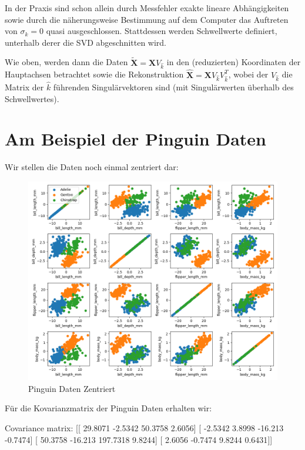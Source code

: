 \documentclass[]{book}
\newenvironment{Shaded}{\begin{snugshade}}{\end{snugshade}}
\newcommand{\FloatTok}[1]{\textcolor[rgb]{0.00,0.00,0.81}{#1}}
\newcommand{\NormalTok}[1]{#1}
\theoremstyle{definition}
\theoremstyle{definition}
\theoremstyle{definition}
\theoremstyle{definition}
\theoremstyle{remark}
\begin{document}
In der Praxis sind schon allein durch Messfehler exakte lineare Abhängigkeiten sowie durch die näherungsweise Bestimmung auf dem Computer das Auftreten von \(\sigma_k =0\) quasi ausgeschlossen. Stattdessen werden Schwellwerte definiert, unterhalb derer die SVD abgeschnitten wird.

Wie oben, werden dann die Daten \(\tilde {\mathbf{X}}={\mathbf{X}}V_{\hat k}\) in den (reduzierten) Koordinaten der Hauptachsen betrachtet sowie die Rekonstruktion \(\hat {\mathbf{X}}= {\mathbf{X}}V_{\hat k}V_{\hat k}^T\), wobei der \(V_{\hat k}\) die Matrix der \(\hat k\) führenden Singulärvektoren sind (mit Singulärwerten überhalb des Schwellwertes).

\hypertarget{am-beispiel-der-pinguin-daten}{%
\section{Am Beispiel der Pinguin Daten}\label{am-beispiel-der-pinguin-daten}}

Wir stellen die Daten noch einmal zentriert dar:

\begin{figure}

{\centering \includegraphics[width=0.75\linewidth]{bilder/05-all-pairs-cntrd} 

}

\caption{Pinguin Daten Zentriert}\label{fig:05-penguin-allpairs-cntrd}
\end{figure}

Für die Kovarianzmatrix der Pinguin Daten erhalten wir:

\begin{Shaded}
\begin{Highlighting}[]
\NormalTok{Covariance matrix: }
\NormalTok{[[ }\FloatTok{29.8071}  \FloatTok{-2.5342}  \FloatTok{50.3758}   \FloatTok{2.6056}\NormalTok{]}
\NormalTok{ [ }\FloatTok{-2.5342}   \FloatTok{3.8998} \FloatTok{-16.213}   \FloatTok{-0.7474}\NormalTok{]}
\NormalTok{ [ }\FloatTok{50.3758} \FloatTok{-16.213}  \FloatTok{197.7318}   \FloatTok{9.8244}\NormalTok{]}
\NormalTok{ [  }\FloatTok{2.6056}  \FloatTok{-0.7474}   \FloatTok{9.8244}   \FloatTok{0.6431}\NormalTok{]]}
\end{Highlighting}
\end{Shaded}
\end{document}
